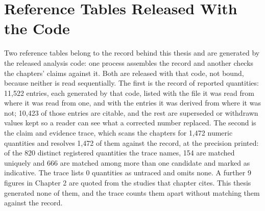 \section{Reference Tables Released With the Code}
\label{app:provenance}

Two reference tables belong to the record behind this thesis and are generated by the released analysis code: one process assembles the record and another checks the chapters' claims against it. Both are released with that code, not bound, because neither is read sequentially. The first is the record of reported quantities: 11,522 entries, each generated by that code, listed with the file it was read from where it was read from one, and with the entries it was derived from where it was not; 10,423 of those entries are citable, and the rest are superseded or withdrawn values kept so a reader can see what a corrected number replaced. The second is the claim and evidence trace, which scans the chapters for 1,472 numeric quantities and resolves 1,472 of them against the record, at the precision printed: of the 820 distinct registered quantities the trace names, 154 are matched uniquely and 666 are matched among more than one candidate and marked as indicative. The trace lists 0 quantities as untraced and omits none. A further 9 figures in Chapter 2 are quoted from the studies that chapter cites. This thesis generated none of them, and the trace counts them apart without matching them against the record.

